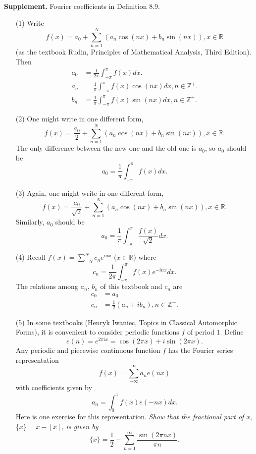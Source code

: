 \documentclass{article}
\begin{document}
\textbf{Supplement.} Fourier coefficients in Definition 8.9.
\begin{enumerate}
\item[(1)]
Write $$f(x) = a_0 + \sum_{n = 1}^{N}(a_n \cos(nx) + b_n \sin(nx)),
x \in \mathbb{R}$$
(as the textbook Rudin, Principles of Mathematical Analysis, Third Edition).
Then
\begin{align*}
a_0 &= \frac{1}{2 \pi} \int_{-\pi}^\pi f(x) dx. \\
a_n &= \frac{1}{\pi} \int_{-\pi}^\pi f(x) \cos(nx) dx, n \in \mathbb{Z}^+. \\
b_n &= \frac{1}{\pi} \int_{-\pi}^\pi f(x) \sin(nx) dx, n \in \mathbb{Z}^+.
\end{align*}

\item[(2)]
One might write in one different form,
$$f(x) = \frac{a_0}{2} + \sum_{n = 1}^{N}(a_n \cos(nx) + b_n \sin(nx)),
x \in \mathbb{R}.$$
The only difference between the new one and the old one is $a_0$,
so $a_0$ should be
$$a_0 = \frac{1}{\pi} \int_{-\pi}^\pi f(x) dx.$$

\item[(3)]
Again, one might write in one different form,
$$f(x) = \frac{a_0}{\sqrt{2}} + \sum_{n = 1}^{N}(a_n \cos(nx) + b_n \sin(nx)),
x \in \mathbb{R}.$$ Similarly, $a_0$ should be
$$a_0 = \frac{1}{\pi} \int_{-\pi}^\pi \frac{f(x)}{\sqrt{2}} dx.$$

\item[(4)]
Recall $f(x) = \sum_{-N}^{N} c_n e^{inx}$ ($x \in \mathbb{R}$) where
$$c_n = \frac{1}{2 \pi} \int_{-\pi}^\pi f(x) e^{-inx} dx.$$
The relations among $a_n$, $b_n$ of this textbook and $c_n$ are
\begin{align*}
c_0 &= a_0 \\
c_n &= \frac{1}{2} \left( a_n + i b_n \right), n \in \mathbb{Z}^+.
\end{align*}

\item[(5)]
In some textbooks (Henryk Iwaniec, Topics in Classical Automorphic Forms),
it is convenient to consider periodic functions $f$ of period $1$.
Define $$e(n) = e^{2 \pi i x} = \cos(2 \pi x) + i \sin(2 \pi x).$$
Any periodic and piecewise continuous function $f$ has the Fourier series representation
$$f(x) = \sum_{-\infty}^{\infty} a_n e(nx)$$
with coefficients given by
$$a_n = \int_{0}^{1} f(x) e(-nx) dx.$$
Here is one exercise for this representation.
\emph{Show that the fractional part of $x$, $\{x\} = x - [x]$, is given by
$$\{x\} = \frac{1}{2} - \sum_{n = 1}^{\infty} \frac{\sin(2 \pi nx)}{\pi n}.$$}
\end{enumerate}
\end{document}
